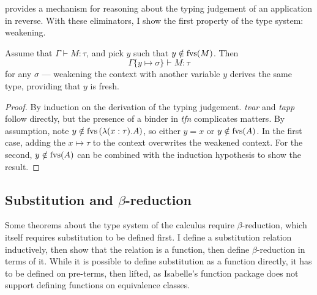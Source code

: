 provides a mechanism for reasoning about the typing judgement of an application in reverse.
With these eliminators, I show the first property of the type system: weakening.

\begin{theorem}
Assume that \(\Gamma \vdash M : \tau\), and pick \(y\) such that \(y \notin \mathrm{fvs}(M)\).
Then
\[\Gamma\{y \mapsto \sigma\} \vdash M : \tau\]
for any \(\sigma\) --- weakening the context with another variable \(y\) derives the same type, providing that \(y\) is fresh.
\end{theorem}
\begin{proof}
By induction on the derivation of the typing judgement.
\emph{tvar} and \emph{tapp} follow directly, but the presence of a binder in \emph{tfn} complicates matters.
By assumption, note \(y \notin \mathrm{fvs}\left(\lambda (x:\tau). A\right)\), so either \(y = x\) or \(y \notin \mathrm{fvs}(A)\).
In the first case, adding the \(x \mapsto \tau\) to the context overwrites the weakened context.
For the second, \(y \notin \mathrm{fvs}(A)\) can be combined with the induction hypothesis to show the result.
\end{proof}

\subsection{Substitution and \(\beta\)-reduction}
\label{sec:beta-reduction}
Some theorems about the type system of the calculus require \(\beta\)-reduction, which itself requires substitution to be defined first.
I define a substitution relation inductively, then show that the relation is a function, then define \(\beta\)-reduction in terms of it.
While it is possible to define substitution as a function directly, it has to be defined on pre-terms, then lifted, as Isabelle's function package does not support defining functions on equivalence classes.

